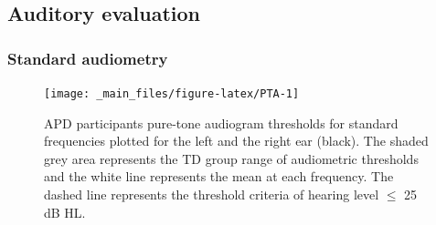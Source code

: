 \documentclass[a4paper, twoside]{templates/ociamthesis}
\begin{document}
\begin{table}

\caption{\label{tab:Study-Procedure}Add caption here.}
\centering
{}
\end{table}

\hypertarget{auditory-evaluation}{%
\subsection{Auditory evaluation}\label{auditory-evaluation}}

\hypertarget{standard-audiometry}{%
\subsubsection{Standard audiometry}\label{standard-audiometry}}

\begin{figure}

{\centering \texttt{[image: \_main\_files/figure-latex/PTA-1]} 

}

\caption{APD participants pure-tone audiogram thresholds for standard frequencies plotted for the left and the right ear (black). The shaded grey area represents the TD group range of audiometric thresholds and the white line represents the mean at each frequency. The dashed line represents the threshold criteria of hearing level $\leq$ 25 dB HL.}\label{fig:PTA}
\end{figure}
\end{document}
